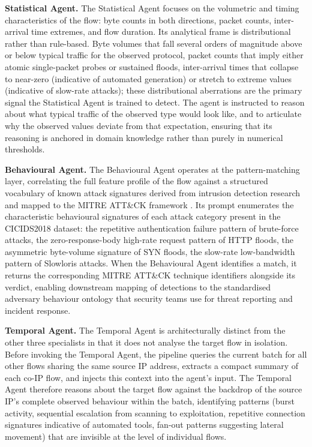 \textbf{Statistical Agent.} The Statistical Agent focuses on the volumetric and timing characteristics of the flow: byte counts in both directions, packet counts, inter-arrival time extremes, and flow duration. Its analytical frame is distributional rather than rule-based. Byte volumes that fall several orders of magnitude above or below typical traffic for the observed protocol, packet counts that imply either atomic single-packet probes or sustained floods, inter-arrival times that collapse to near-zero (indicative of automated generation) or stretch to extreme values (indicative of slow-rate attacks); these distributional aberrations are the primary signal the Statistical Agent is trained to detect. The agent is instructed to reason about what typical traffic of the observed type would look like, and to articulate why the observed values deviate from that expectation, ensuring that its reasoning is anchored in domain knowledge rather than purely in numerical thresholds.

\textbf{Behavioural Agent.} The Behavioural Agent operates at the pattern-matching layer, correlating the full feature profile of the flow against a structured vocabulary of known attack signatures derived from intrusion detection research and mapped to the MITRE ATT\&CK framework \autocite{MITRE2023}. Its prompt enumerates the characteristic behavioural signatures of each attack category present in the CICIDS2018 dataset: the repetitive authentication failure pattern of brute-force attacks, the zero-response-body high-rate request pattern of HTTP floods, the asymmetric byte-volume signature of SYN floods, the slow-rate low-bandwidth pattern of Slowloris attacks. When the Behavioural Agent identifies a match, it returns the corresponding MITRE ATT\&CK technique identifiers alongside its verdict, enabling downstream mapping of detections to the standardised adversary behaviour ontology that security teams use for threat reporting and incident response.

\textbf{Temporal Agent.} The Temporal Agent is architecturally distinct from the other three specialists in that it does not analyse the target flow in isolation. Before invoking the Temporal Agent, the pipeline queries the current batch for all other flows sharing the same source IP address, extracts a compact summary of each co-IP flow, and injects this context into the agent's input. The Temporal Agent therefore reasons about the target flow against the backdrop of the source IP's complete observed behaviour within the batch, identifying patterns (burst activity, sequential escalation from scanning to exploitation, repetitive connection signatures indicative of automated tools, fan-out patterns suggesting lateral movement) that are invisible at the level of individual flows.

